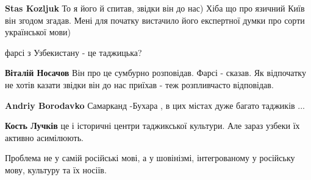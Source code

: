 \begin{itemize}
\begin{itemize}
\textbf{Stas Kozljuk}
То я його й спитав, звідки він до нас)
Хіба що про язичний Київ він згодом згадав.
Мені для початку вистачило його експертної думки про сорти української мови)
\end{itemize}

 
фарсі з Узбекистану - це таджицька?

\begin{itemize}
 
\textbf{Віталій Носачов}
Він про це сумбурно розповідав. Фарсі - сказав.
Як відпочатку не хотів казати звідки він до нас приїхав - теж розпливчасто відповідав.

 
\textbf{Andriy Borodavko} Самарканд -Бухара , в цих містах дуже багато таджиків ...

 
\textbf{Кость Лучків} це і історичні центри таджикської культури. Але зараз узбеки їх активно асимілюють.
\end{itemize}

 
Проблема не у самій російські мові, а у шовінізмі, інтегрованому у російську мову, культуру та їх носіїв.

 

\end{itemize}
